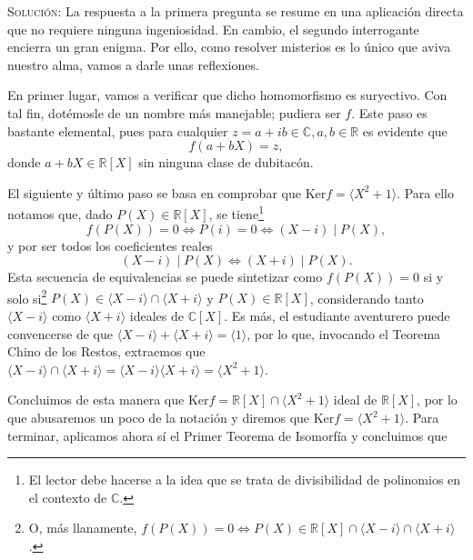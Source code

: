 \documentclass{article}
\renewcommand{\ker}{\text{Ker}}
\begin{document}
\begin{enumerate}
    \vspace{7px}

    \textsc{Solución}: La respuesta a la primera pregunta se resume en una aplicación directa que no requiere ninguna ingeniosidad. En cambio, el segundo interrogante encierra un gran enigma. Por ello, como resolver misterios es lo único que aviva nuestro alma, vamos a darle unas reflexiones.

    En primer lugar, vamos a verificar que dicho homomorfismo es suryectivo. Con tal fin, dotémosle de un nombre más manejable; pudiera ser $f$. Este paso es bastante elemental, pues para cualquier $z = a + ib \in \mathbb{C}, a, b \in \mathbb{R}$ es evidente que \[f(a + bX) = z,\] donde $a + bX \in \mathbb{R}[X]$ sin ninguna clase de dubitacón.

    El siguiente y último paso se basa en comprobar que $\ker f = \langle X^2 + 1\rangle$. Para ello notamos que, dado $P(X) \in \mathbb{R}[X]$, se tiene\footnote{El lector debe hacerse a la idea que se trata de divisibilidad de polinomios en el contexto de $\mathbb{C}$.} \[f(P(X)) = 0 \iff P(i) = 0 \iff (X - i) \mid P(X),\] y por ser todos los coeficientes reales \[(X - i) \mid P(X) \iff (X + i) \mid P(X).\] Esta secuencia de equivalencias se puede sintetizar como $f(P(X)) = 0$ si y solo si\footnote{O, más llanamente, $f(P(X)) = 0 \iff P(X) \in \mathbb{R}[X] \cap \langle X - i \rangle \cap \langle X + i \rangle$.} $P(X) \in \langle X - i \rangle \cap \langle X + i \rangle$ y $P(X) \in \mathbb{R}[X]$, considerando tanto $\langle X - i \rangle$ como $\langle X + i \rangle$ ideales de $\mathbb{C}[X]$.
    Es más, el estudiante aventurero puede convencerse de que $\langle X - i \rangle + \langle X + i \rangle = \langle 1 \rangle$, por lo que, invocando el Teorema Chino de los Restos, extraemos que $\langle X - i \rangle \cap \langle X + i \rangle = \langle X - i \rangle \langle X + i \rangle = \langle X^2 + 1 \rangle$.


    Concluimos de esta manera que $\ker f = \mathbb{R}[X] \cap \langle X^2 + 1 \rangle$ ideal de $\mathbb{R}[X]$, por lo que abusaremos un poco de la notación y diremos que $\ker f = \langle X^2 + 1 \rangle$. Para terminar, aplicamos ahora sí el Primer Teorema de Isomorfía y concluimos que


\end{enumerate}
\end{document}

